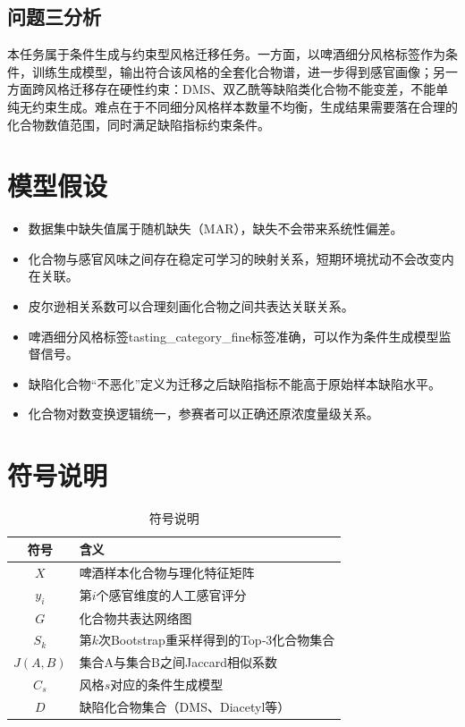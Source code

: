 \documentclass[12pt,a4paper]{article}
\begin{document}
\subsection{问题三分析}
本任务属于条件生成与约束型风格迁移任务。一方面，以啤酒细分风格标签作为条件，训练生成模型，输出符合该风格的全套化合物谱，进一步得到感官画像；另一方面跨风格迁移存在硬性约束：DMS、双乙酰等缺陷类化合物不能变差，不能单纯无约束生成。难点在于不同细分风格样本数量不均衡，生成结果需要落在合理的化合物数值范围，同时满足缺陷指标约束条件。

\section{模型假设}
\begin{itemize}
    \item[H1] 数据集中缺失值属于随机缺失（MAR），缺失不会带来系统性偏差。
    \item[H2] 化合物与感官风味之间存在稳定可学习的映射关系，短期环境扰动不会改变内在关联。
    \item[H3] 皮尔逊相关系数可以合理刻画化合物之间共表达关联关系。
    \item[H4] 啤酒细分风格标签tasting\_category\_fine标签准确，可以作为条件生成模型监督信号。
    \item[H5] 缺陷化合物“不恶化”定义为迁移之后缺陷指标不能高于原始样本缺陷水平。
    \item[H6] 化合物对数变换逻辑统一，参赛者可以正确还原浓度量级关系。
\end{itemize}

\section{符号说明}
\begin{table}[htbp]
    \centering
    \begin{tabular}{c p{7cm}}
        \toprule
        符号 & 含义 \\
        \midrule
        $X$ & 啤酒样本化合物与理化特征矩阵 \\
        $y_i$ & 第$i$个感官维度的人工感官评分 \\
        $G$ & 化合物共表达网络图 \\
        $S_k$ & 第$k$次Bootstrap重采样得到的Top‑3化合物集合 \\
        $J(A,B)$ & 集合A与集合B之间Jaccard相似系数 \\
        $C_s$ & 风格$s$对应的条件生成模型 \\
        $D$ & 缺陷化合物集合（DMS、Diacetyl等） \\
        \bottomrule
    \end{tabular}
    \caption{符号说明}
\end{table}
\end{document}
